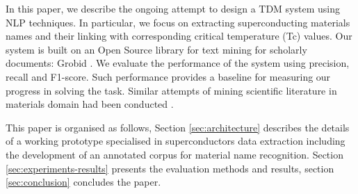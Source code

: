 \documentclass{article}[a4]
\begin{document}



In this paper, we describe the ongoing attempt to design a TDM system using NLP techniques. In particular, we focus on extracting superconducting materials names and their linking with corresponding critical temperature (Tc) values.
Our system is built on an Open Source library for text mining for scholarly documents: Grobid \cite{GROBID}. We evaluate the performance of the system using precision, recall and F1-score. Such performance provides a baseline for measuring our progress in solving the task.
Similar attempts of mining scientific literature in materials domain had been conducted \cite{nanocrystal_extraction} \cite{court2018auto}. 

This paper is organised as follows, Section \ref{sec:architecture} describes the details of a working prototype specialised in superconductors data extraction including the development of an annotated corpus for material name recognition. Section \ref{sec:experiments-results} presents the evaluation methods and results, section \ref{sec:conclusion} concludes the paper.
\end{document}
